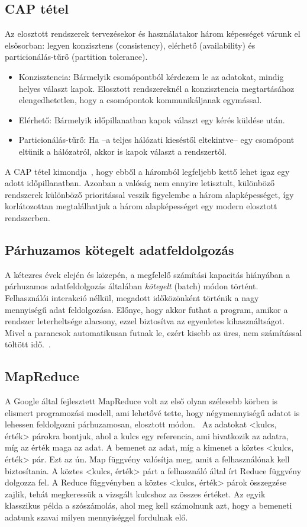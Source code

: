 \documentclass[a4paper,12pt]{article}
\begin{document}
\subsection{CAP tétel}
Az elosztott rendszerek tervezésekor és használatakor három képességet várunk el elsősorban: legyen konzisztens (consistency), elérhető (availability) és particionálás-tűrő (partition tolerance). 
\begin{itemize}
\item Konzisztencia: Bármelyik csomópontból kérdezem le az adatokat, mindig helyes választ kapok. Elosztott rendszereknél a konzisztencia megtartásához elengedhetetlen, hogy a csomópontok kommunikáljanak egymással. 
\item Elérhető: Bármelyik időpillanatban kapok választ egy kérés küldése után.
\item Particionálás-tűrő: Ha --a teljes hálózati kieséstől eltekintve-- egy csomópont eltűnik a hálózatról, akkor is kapok választ a rendszertől.
\end{itemize}
A CAP tétel kimondja~\cite{cap}, hogy ebből a háromból legfeljebb kettő lehet igaz egy adott időpillanatban. Azonban a valóság nem ennyire letisztult, különböző rendszerek különböző prioritással veszik figyelembe a három alapképességet, így korlátozottan megtalálhatjuk a három alapképességet egy modern elosztott rendszerben.~\cite{ecap}

\subsection{Párhuzamos kötegelt adatfeldolgozás}
A kétezres évek elején és közepén, a megfelelő számítási kapacitás hiányában a párhuzamos adatfeldolgozás általában \textsl{kötegelt} (batch) módon történt. Felhasználói interakció nélkül, megadott időközönként történik a nagy mennyiségű adat feldolgozása. Előnye, hogy akkor futhat a program, amikor a rendszer leterheltsége alacsony, ezzel biztosítva az egyenletes kihasználtságot. Mivel a parancsok automatikusan futnak le, ezért kisebb az üres, nem számítással töltött idő.~\cite{batch}.

\subsection{MapReduce}
A Google által fejlesztett MapReduce volt az első olyan szélesebb körben is elismert programozási modell, ami lehetővé tette, hogy négymennyiségű adatot is lehessen feldolgozni párhuzamosan, elosztott módon.~\cite{mapreduce} Az adatokat <kulcs, érték> párokra bontjuk, ahol a kulcs egy referencia, ami hivatkozik az adatra, míg az érték maga az adat. A bemenet az adat, míg a kimenet a köztes <kulcs, érték> pár. Ezt az ún. Map függvény valósítja meg, amit a felhasználónak kell biztosítania. A köztes <kulcs, érték> párt a felhasználó által írt Reduce függvény dolgozza fel. A Reduce függvényben a köztes <kulcs, érték> párok összegzése  zajlik, tehát megkeressük a vizsgált kulcshoz az összes értéket. \newline
Az egyik klasszikus példa a szószámolás, ahol meg kell számolnunk azt, hogy a bemeneti adatunk szavai milyen mennyiséggel fordulnak elő.
\end{document}
